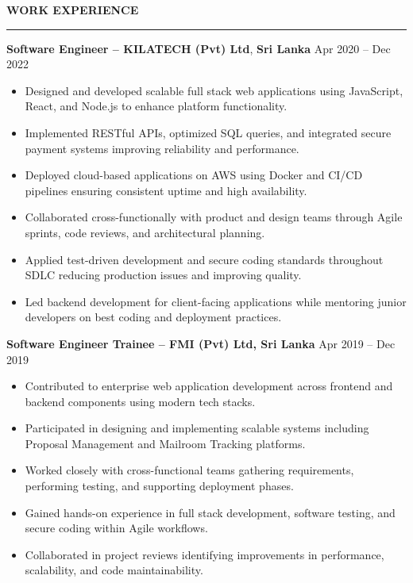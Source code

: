 \documentclass[10pt,letterpaper]{article}
\begin{document}
\vspace{8pt}

\textbf{WORK EXPERIENCE}\\[-8pt]
\noindent\rule{\textwidth}{1pt}

\vspace{-2pt}

\textbf{Software Engineer -- KILATECH (Pvt) Ltd}, \textbf{Sri Lanka} \hfill Apr 2020 -- Dec 2022

\vspace{-1pt}

\begin{itemize}
\item Designed and developed scalable full stack web applications using JavaScript, React, and Node.js to enhance platform functionality.
\item Implemented RESTful APIs, optimized SQL queries, and integrated secure payment systems improving reliability and performance.
\item Deployed cloud-based applications on AWS using Docker and CI/CD pipelines ensuring consistent uptime and high availability.
\item Collaborated cross-functionally with product and design teams through Agile sprints, code reviews, and architectural planning.
\item Applied test-driven development and secure coding standards throughout SDLC reducing production issues and improving quality.
\item Led backend development for client-facing applications while mentoring junior developers on best coding and deployment practices.
\end{itemize}

\textbf{Software Engineer Trainee -- FMI (Pvt) Ltd, Sri Lanka} \hfill Apr 2019 -- Dec 2019

\vspace{-1pt}

\begin{itemize}
\item Contributed to enterprise web application development across frontend and backend components using modern tech stacks.
\item Participated in designing and implementing scalable systems including Proposal Management and Mailroom Tracking platforms.
\item Worked closely with cross-functional teams gathering requirements, performing testing, and supporting deployment phases.
\item Gained hands-on experience in full stack development, software testing, and secure coding within Agile workflows.
\item Collaborated in project reviews identifying improvements in performance, scalability, and code maintainability.
\end{itemize}
\end{document}
